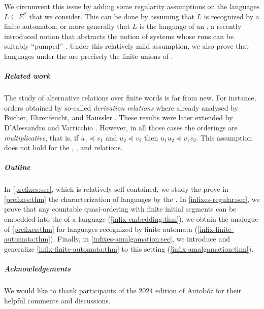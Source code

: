 We circumvent this issue by adding some regularity assumptions on the languages
$L \subseteq \Sigma^*$ that we consider. This can be done by assuming that $L$
is recognized by a finite automaton, or more generally that $L$ is the language
of an , a recently introduced notion that abstracts the
notion of systems whose runs can be suitably ``pumped'' \cite{ASZZ24}. Under
this relatively mild assumption, we also prove that 
languages under the  are precisely the finite unions of
.

\subparagraph{Related work} The study of alternative 
relations over finite words is far from new. For instance, orders obtained by
so-called \emph{derivation relations} where already analysed by Bucher,
Ehrenfeucht, and Haussler \cite{BUEUD85}. These results were later extended by
D'Alessandro and Varricchio \cite{ALVA03,ALVA06}. However, in all those cases
the orderings are \emph{multiplicative}, that is, if $u_1 \preceq v_1$ and $u_2
\preceq v_2$ then $u_1u_2 \preceq v_1v_2$. This assumption does not hold for
the , , and  relations.

\subparagraph{Outline} In \cref{prefixes:sec}, which is relatively
self-contained, we study the  prove in \cref{prefixes:thm}
the characterization of  languages by the . In \cref{infixes-regular:sec}, we prove that any countable quasi-ordering
with finite initial segments can be embedded into the  of a
language (\cref{infix-embedding:thm}), we obtain the analogue of
\cref{prefixes:thm} for languages recognized by finite automata
(\cref{infix-finite-automata:thm}). Finally, in \cref{infixes-amalgamation:sec}, we
introduce  and generalize
\cref{infix-finite-automata:thm} to this setting
(\cref{infix-amalgamation:thm}).

\subparagraph{Acknowledgements} We would like to thank participants of the 2024
edition of Autobóz for their helpful comments and discussions.
